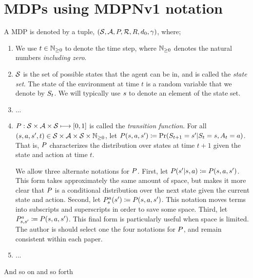 \documentclass[a4paper]{article}
\begin{document}
\section{MDPs using MDPNv1 notation}
\label{sec:mdps}
A \gls{MDP} is denoted by a tuple, $\MDP$, where;
%
\begin{enumerate}
    \item We use $\TimeStep$ to denote the time step, where $\NZ$ denotes the natural numbers {\em including zero}.

    \item $\StateSpace$ is the set of possible states that the agent can be in, and is called the {\em state set}. The state of the environment at time $t$ is a random variable that we denote by $\StateT{t}$. We will typically use $\State$ to denote an element of the state set.

    \item ...

    \item $\TransitionFunctionFull$ is called the {\em transition function}. For all $(s,a,s',t) \in \StateSpace \times \ActionSpace \times \StateSpace \times \NZ$, let $\TransitionFunction(s,a,s')\coloneqq\Pr(\StateT{t+1}=s' | \StateT{t}=s, \ActionT{t}=a)$.
    That is, $\TransitionFunction$ characterizes the distribution over states at time $t+1$ given the state and action at time $t$.

    We allow three alternate notations for $\TransitionFunction$.
    First, let $\TransitionA{s}{a}{s'} \coloneqq \TransitionFunction(s,a,s')$.
    This form takes approximately the same amount of space, but makes it more clear that $\TransitionFunction$ is a conditional distribution over the next state given the current state and action.
    Second, let $\TransitionB{s}{a}{s'} \coloneqq \TransitionFunction(s,a,s')$.
    This notation moves terms into subscripts and superscripts in order to save some space.
    Third, let $\TransitionC{s}{a}{s'} \coloneqq \TransitionFunction(s,a,s')$.
    This final form is particularly useful when space is limited.
    The author is should select one the four notations for $\TransitionFunction$, and remain consistent within each paper.

    \item ...

\end{enumerate}
%
And so on and so forth




\end{document}
